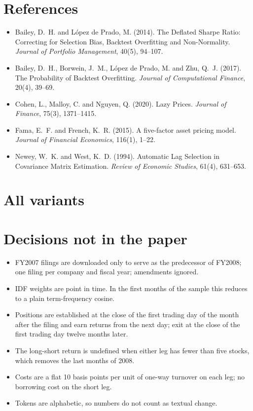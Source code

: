 \documentclass[11pt,a4paper]{article}
\begin{document}
\section*{References}
\begin{itemize}\setlength\itemsep{2pt}
\item Bailey, D.~H. and L\'opez de Prado, M. (2014). The Deflated Sharpe Ratio: Correcting for Selection Bias, Backtest Overfitting and Non-Normality. \emph{Journal of Portfolio Management}, 40(5), 94--107.
\item Bailey, D.~H., Borwein, J.~M., L\'opez de Prado, M. and Zhu, Q.~J. (2017). The Probability of Backtest Overfitting. \emph{Journal of Computational Finance}, 20(4), 39--69.
\item Cohen, L., Malloy, C. and Nguyen, Q. (2020). Lazy Prices. \emph{Journal of Finance}, 75(3), 1371--1415.
\item Fama, E.~F. and French, K.~R. (2015). A five-factor asset pricing model. \emph{Journal of Financial Economics}, 116(1), 1--22.
\item Newey, W.~K. and West, K.~D. (1994). Automatic Lag Selection in Covariance Matrix Estimation. \emph{Review of Economic Studies}, 61(4), 631--653.
\end{itemize}

\appendix
\section{All variants}


\section{Decisions not in the paper}
\begin{itemize}\setlength\itemsep{2pt}
\item FY2007 filings are downloaded only to serve as the predecessor of FY2008; one filing per company and fiscal year; amendments ignored.
\item IDF weights are point in time. In the first months of the sample this reduces to a plain term-frequency cosine.
\item Positions are established at the close of the first trading day of the month after the filing and earn returns from the next day; exit at the close of the first trading day twelve months later.
\item The long-short return is undefined when either leg has fewer than five stocks, which removes the last months of 2008.
\item Costs are a flat 10 basis points per unit of one-way turnover on each leg; no borrowing cost on the short leg.
\item Tokens are alphabetic, so numbers do not count as textual change.
\end{itemize}
\end{document}
